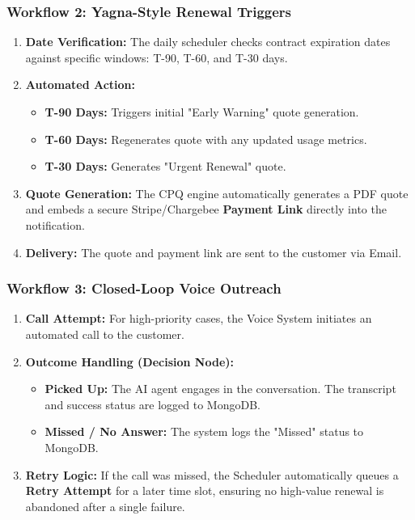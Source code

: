 \documentclass[12pt,a4paper]{article}
\begin{document}
\subsubsection{Workflow 2: Yagna-Style Renewal Triggers}
\begin{enumerate}
    \item \textbf{Date Verification:} The daily scheduler checks contract expiration dates against specific windows: T-90, T-60, and T-30 days.
    \item \textbf{Automated Action:}
    \begin{itemize}
        \item \textbf{T-90 Days:} Triggers initial "Early Warning" quote generation.
        \item \textbf{T-60 Days:} Regenerates quote with any updated usage metrics.
        \item \textbf{T-30 Days:} Generates "Urgent Renewal" quote.
    \end{itemize}
    \item \textbf{Quote Generation:} The CPQ engine automatically generates a PDF quote and embeds a secure Stripe/Chargebee \textbf{Payment Link} directly into the notification.
    \item \textbf{Delivery:} The quote and payment link are sent to the customer via Email.
\end{enumerate}

\subsubsection{Workflow 3: Closed-Loop Voice Outreach}
\begin{enumerate}
    \item \textbf{Call Attempt:} For high-priority cases, the Voice System initiates an automated call to the customer.
    \item \textbf{Outcome Handling (Decision Node):}
    \begin{itemize}
        \item \textbf{Picked Up:} The AI agent engages in the conversation. The transcript and success status are logged to MongoDB.
        \item \textbf{Missed / No Answer:} The system logs the "Missed" status to MongoDB.
    \end{itemize}
    \item \textbf{Retry Logic:} If the call was missed, the Scheduler automatically queues a \textbf{Retry Attempt} for a later time slot, ensuring no high-value renewal is abandoned after a single failure.
\end{enumerate}
\end{document}
